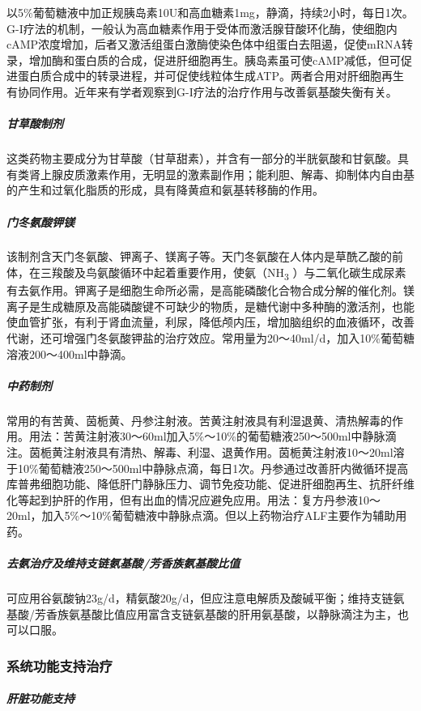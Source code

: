 以5\%葡萄糖液中加正规胰岛素10U和高血糖素1mg，静滴，持续2小时，每日1次。G-I疗法的机制，一般认为高血糖素作用于受体而激活腺苷酸环化酶，使细胞内cAMP浓度增加，后者又激活组蛋白激酶使染色体中组蛋白去阻遏，促使mRNA转录，增加酶和蛋白质的合成，促进肝细胞再生。胰岛素虽可使cAMP减低，但可促进蛋白质合成中的转录进程，并可促使线粒体生成ATP。两者合用对肝细胞再生有协同作用。近年来有学者观察到G-I疗法的治疗作用与改善氨基酸失衡有关。

\subparagraph{甘草酸制剂}

这类药物主要成分为甘草酸（甘草甜素），并含有一部分的半胱氨酸和甘氨酸。具有类肾上腺皮质激素作用，无明显的激素副作用；能利胆、解毒、抑制体内自由基的产生和过氧化脂质的形成，具有降黄疸和氨基转移酶的作用。

\subparagraph{门冬氨酸钾镁}

该制剂含天门冬氨酸、钾离子、镁离子等。天门冬氨酸在人体内是草酰乙酸的前体，在三羧酸及鸟氨酸循环中起着重要作用，使氨（NH\textsubscript{3}
）与二氧化碳生成尿素有去氨作用。钾离子是细胞生命所必需，是高能磷酸化合物合成分解的催化剂。镁离子是生成糖原及高能磷酸键不可缺少的物质，是糖代谢中多种酶的激活剂，也能使血管扩张，有利于肾血流量，利尿，降低颅内压，增加脑组织的血液循环，改善代谢，还可增强门冬氨酸钾盐的治疗效应。常用量为20～40ml/d，加入10\%葡萄糖溶液200～400ml中静滴。

\subparagraph{中药制剂}

常用的有苦黄、茵栀黄、丹参注射液。苦黄注射液具有利湿退黄、清热解毒的作用。用法：苦黄注射液30～60ml加入5\%～10\%的葡萄糖液250～500ml中静脉滴注。茵栀黄注射液具有清热、解毒、利湿、退黄作用。茵栀黄注射液10～20ml溶于10\%葡萄糖液250～500ml中静脉点滴，每日1次。丹参通过改善肝内微循环提高库普弗细胞功能、降低肝门静脉压力、调节免疫功能、促进肝细胞再生、抗肝纤维化等起到护肝的作用，但有出血的情况应避免应用。用法：复方丹参液10～20ml，加入5\%～10\%葡萄糖液中静脉点滴。但以上药物治疗ALF主要作为辅助用药。

\subparagraph{去氨治疗及维持支链氨基酸/芳香族氨基酸比值}

可应用谷氨酸钠23g/d，精氨酸20g/d，但应注意电解质及酸碱平衡；维持支链氨基酸/芳香族氨基酸比值应用富含支链氨基酸的肝用氨基酸，以静脉滴注为主，也可以口服。

\subsubsection{系统功能支持治疗}

\subparagraph{肝脏功能支持}

